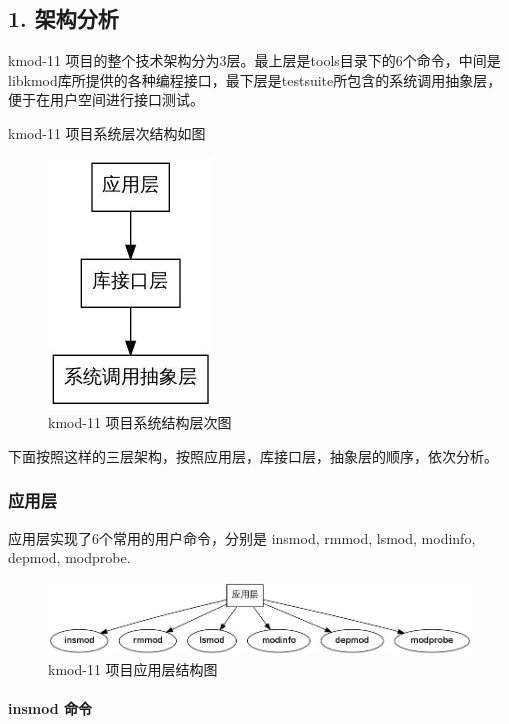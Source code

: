 \documentclass[11pt,a4paper]{article}
\makeatletter
\def\maxwidth{\ifdim\Gin@nat@width>\linewidth\linewidth
\else\Gin@nat@width\fi}
\let\Oldincludegraphics\includegraphics
\renewcommand{\includegraphics}[1]{\Oldincludegraphics[width=\maxwidth]{#1}}
\makeatother
\begin{document}
\subsection{1. 架构分析}

kmod-11
项目的整个技术架构分为3层。最上层是tools目录下的6个命令，中间是libkmod库所提供的各种编程接口，最下层是testsuite所包含的系统调用抽象层，便于在用户空间进行接口测试。

kmod-11 项目系统层次结构如图

\begin{figure}[htbp]
\centering
\includegraphics{./figures/0-overview.jpg}
\caption{kmod-11 项目系统结构层次图}
\end{figure}

下面按照这样的三层架构，按照应用层，库接口层，抽象层的顺序，依次分析。

\subsubsection{应用层}

应用层实现了6个常用的用户命令，分别是 insmod, rmmod, lsmod, modinfo,
depmod, modprobe.

\begin{figure}[htbp]
\centering
\includegraphics{./figures/1-app.jpg}
\caption{kmod-11 项目应用层结构图}
\end{figure}

\paragraph{insmod 命令}
\end{document}
